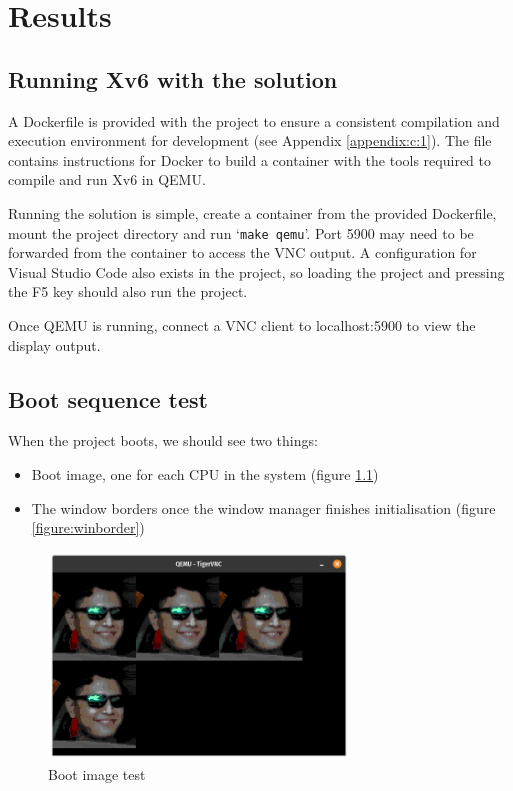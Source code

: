 \chapter{Results}
\label{chapter3}

\section{Running Xv6 with the solution}
A Dockerfile is provided with the project to ensure a consistent compilation
and execution environment for development (see Appendix \ref{appendix:c:1}).
The file contains instructions for Docker to build a container with the tools
required to compile and run Xv6 in QEMU.

Running the solution is simple, create a container from the provided Dockerfile,
mount the project directory and run `\texttt{make qemu}'. Port 5900 may
need to be forwarded from the container to access the VNC output. A configuration
for Visual Studio Code also exists in the project, so loading the project and
pressing the F5 key should also run the project.

Once QEMU is running, connect a VNC client to localhost:5900 to view the display
output.

\section{Boot sequence test}

When the project boots, we should see two things:
\begin{itemize}
    \item Boot image, one for each CPU in the system (figure \ref{figure:bootimg})
    \item The window borders once the window manager finishes initialisation (figure \ref{figure:winborder})
\end{itemize}

\begin{figure}[H]
    \centering
    \includegraphics[width=8cm]{bootimage.png}
    \caption{Boot image test}
    \label{figure:bootimg}
\end{figure}

